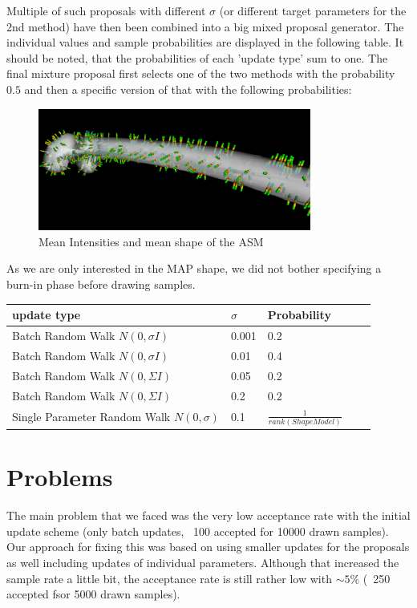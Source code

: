 \documentclass{article}
\begin{document}
	Multiple of such proposals with different $\sigma$ (or different target parameters for the 2nd method) have then been combined into a big mixed proposal generator.
	The individual values and sample probabilities are displayed in the following table.
	It should be noted, that the probabilities of each 'update type' sum to one.
	The final mixture proposal first selects one of the two methods with the probability $0.5$ and then a specific version of that with the following probabilities:
	\begin{figure}
		\centering
			\centering
			\includegraphics[width=0.8\textwidth]{images/mean_pixelintensities.png}
			\caption{Mean Intensities and mean shape of the ASM}
			\label{1.1}
	\end{figure}	
	As we are only interested in the MAP shape, we did not bother specifying a burn-in phase before drawing samples.

	\begin{center}
		\begin{tabular}{l l l l l}
			\toprule
			update type & $\sigma$ & Probability \\
			\midrule
			Batch Random Walk $N(0, \sigma I)$&  0.001 & 	0.2  	\\
			Batch Random Walk $N(0, \sigma I)$& 0.01 & 	0.4 	\\
			Batch Random Walk $N(0, \Sigma I)$& 0.05 &	0.2		\\
			Batch Random Walk $N(0, \Sigma I)$& 0.2&		0.2		\\
			Single Parameter Random Walk $N(0,\sigma)$ & 0.1& $\frac{1}{rank(ShapeModel)}$
		\end{tabular}
	\end{center}
	\section{Problems}
	The main problem that we faced was the very low acceptance rate with the initial update scheme (only batch updates, ~100 accepted for 10000 drawn samples).
	Our approach for fixing this was based on using smaller updates for the proposals as well including updates of individual parameters.
	Although that increased the sample rate a little bit, the acceptance rate is still rather low with $\sim 5\%$ (~250 accepted fsor 5000 drawn samples).
	
\end{document}
